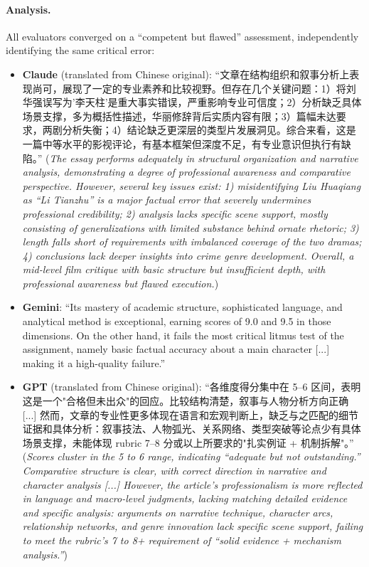 \documentclass{article}
\newcommand{\zh}[1]{#1}
\newcommand{\zh}[1]{\begin{CJK}{UTF8}{gbsn}#1\end{CJK}}
\begin{document}
\paragraph{Analysis.} All evaluators converged on a ``competent but flawed'' assessment, independently identifying the same critical error:
\begin{itemize}
    \item \textbf{Claude} (translated from Chinese original): ``\zh{文章在结构组织和叙事分析上表现尚可，展现了一定的专业素养和比较视野。但存在几个关键问题：1）将刘华强误写为'李天柱'是重大事实错误，严重影响专业可信度；2）分析缺乏具体场景支撑，多为概括性描述，华丽修辞背后实质内容有限；3）篇幅未达要求，两剧分析失衡；4）结论缺乏更深层的类型片发展洞见。综合来看，这是一篇中等水平的影视评论，有基本框架但深度不足，有专业意识但执行有缺陷。}'' (\textit{The essay performs adequately in structural organization and narrative analysis, demonstrating a degree of professional awareness and comparative perspective. However, several key issues exist: 1) misidentifying Liu Huaqiang as ``Li Tianzhu'' is a major factual error that severely undermines professional credibility; 2) analysis lacks specific scene support, mostly consisting of generalizations with limited substance behind ornate rhetoric; 3) length falls short of requirements with imbalanced coverage of the two dramas; 4) conclusions lack deeper insights into crime genre development. Overall, a mid-level film critique with basic structure but insufficient depth, with professional awareness but flawed execution.})
    \item \textbf{Gemini}: ``Its mastery of academic structure, sophisticated language, and analytical method is exceptional, earning scores of 9.0 and 9.5 in those dimensions. On the other hand, it fails the most critical litmus test of the assignment, namely basic factual accuracy about a main character [...] making it a high-quality failure.''
    \item \textbf{GPT} (translated from Chinese original): ``\zh{各维度得分集中在 5–6 区间，表明这是一个"合格但未出众"的回应。比较结构清楚，叙事与人物分析方向正确} [...] \zh{然而，文章的专业性更多体现在语言和宏观判断上，缺乏与之匹配的细节证据和具体分析：叙事技法、人物弧光、关系网络、类型突破等论点少有具体场景支撑，未能体现 rubric 7–8 分或以上所要求的"扎实例证 + 机制拆解"。}'' (\textit{Scores cluster in the 5 to 6 range, indicating ``adequate but not outstanding.'' Comparative structure is clear, with correct direction in narrative and character analysis [...] However, the article's professionalism is more reflected in language and macro-level judgments, lacking matching detailed evidence and specific analysis: arguments on narrative technique, character arcs, relationship networks, and genre innovation lack specific scene support, failing to meet the rubric's 7 to 8+ requirement of ``solid evidence + mechanism analysis.''})
\end{itemize}
\end{document}
